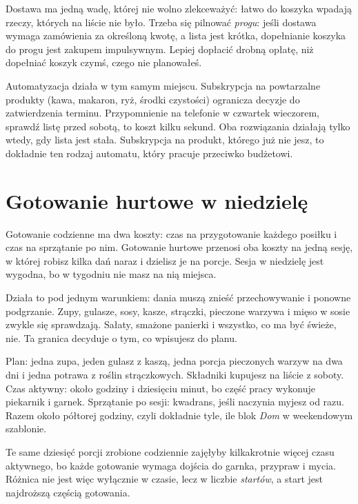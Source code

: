 Dostawa ma jedną wadę, której nie wolno zlekceważyć: łatwo do koszyka
wpadają rzeczy, których na liście nie było. Trzeba się pilnować
\emph{progu}: jeśli dostawa wymaga zamówienia za określoną kwotę, a lista
jest krótka, dopełnianie koszyka do progu jest zakupem impulsywnym. Lepiej
dopłacić drobną opłatę, niż dopełniać koszyk czymś, czego nie planowałeś.

Automatyzacja działa w tym samym miejscu. Subskrypcja na powtarzalne
produkty (kawa, makaron, ryż, środki czystości) ogranicza decyzje do
zatwierdzenia terminu. Przypomnienie na telefonie w czwartek wieczorem,
\glqq sprawdź listę przed sobotą\grqq{}, to koszt kilku sekund. Oba
rozwiązania działają tylko wtedy, gdy lista jest stała. Subskrypcja na
produkt, którego już nie jesz, to dokładnie ten rodzaj automatu, który
pracuje przeciwko budżetowi.

\section{Gotowanie hurtowe w niedzielę}

Gotowanie codzienne ma dwa koszty: czas na przygotowanie każdego posiłku
i czas na sprzątanie po nim. Gotowanie hurtowe przenosi oba koszty na
jedną sesję, w której robisz kilka dań naraz i dzielisz je na porcje.
Sesja w niedzielę jest wygodna, bo w tygodniu nie masz na nią miejsca.

Działa to pod jednym warunkiem: dania muszą znieść przechowywanie i ponowne
podgrzanie. Zupy, gulasze, sosy, kasze, strączki, pieczone warzywa i
mięso w sosie zwykle się sprawdzają. Sałaty, smażone panierki i wszystko,
co ma być świeże, nie. Ta granica decyduje o tym, co wpisujesz do planu.

\begin{przyklad}
Plan: jedna zupa, jeden gulasz z kaszą, jedna porcja pieczonych warzyw na
dwa dni i jedna potrawa z roślin strączkowych. Składniki kupujesz na
liście z soboty. Czas aktywny: około godziny i dziesięciu minut, bo część
pracy wykonuje piekarnik i garnek. Sprzątanie po sesji: kwadrans, jeśli
naczynia myjesz od razu. Razem około półtorej godziny, czyli dokładnie
tyle, ile blok \emph{Dom} w weekendowym szablonie.

Te same dziesięć porcji zrobione codziennie zajęłyby kilkakrotnie więcej
czasu aktywnego, bo każde gotowanie wymaga dojścia do garnka, przypraw i
mycia. Różnica nie jest więc wyłącznie w czasie, lecz w liczbie
\emph{startów}, a start jest najdroższą częścią gotowania.
\end{przyklad}

